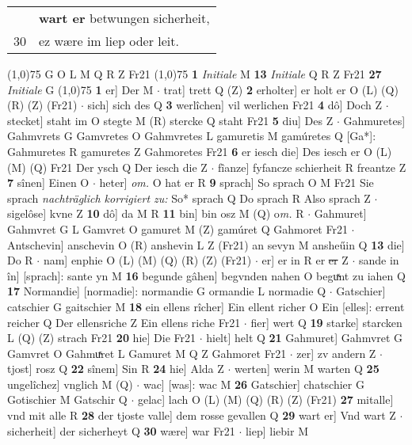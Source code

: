 \documentclass[8pt,a4paper,notitlepage]{article}
\begin{document}
\begin{table}[ht]
\begin{minipage}[t]{0.5\linewidth}
\begin{tabular}{rl}
 & \textbf{wart er} betwungen sicherheit,\\ 
30 & ez wære im liep oder leit.\\ 
\end{tabular}
\scriptsize
\line(1,0){75} \newline
G O L M Q R Z Fr21 \newline
\line(1,0){75} \newline
\textbf{1} \textit{Initiale} M  \textbf{13} \textit{Initiale} Q R Z Fr21  \textbf{27} \textit{Initiale} G  \newline
\line(1,0){75} \newline
\textbf{1} er] Der M  $\cdot$ trat] trett Q (Z) \textbf{2} erholter] er holt er O (L) (Q) (R) (Z) (Fr21)  $\cdot$ sich] sich des Q \textbf{3} werlîchen] vil werlichen Fr21 \textbf{4} dô] Doch Z  $\cdot$ stecket] staht im O stegte M (R) stercke Q staht Fr21 \textbf{5} diu] Des Z  $\cdot$ Gahmuretes] Gahmvrets G Gamvretes O Gahmvretes L gamuretis M gamúretes Q [Ga*]: Gahmuretes R gamuretes Z Gahmoretes Fr21 \textbf{6} er iesch die] Des iesch er O (L) (M) (Q) Fr21 Der ysch Q Der iesch die Z  $\cdot$ fîanze] fyfancze schierheit R freantze Z \textbf{7} sînen] Einen O  $\cdot$ heter] \textit{om.} O hat er R \textbf{9} sprach] So sprach O M Fr21 Sie sprach \textit{nachträglich korrigiert zu:} So* sprach Q Do sprach R Also sprach Z  $\cdot$ sigelôse] kvne Z \textbf{10} dô] da M R \textbf{11} bin] bin osz M (Q) o\textit{m. } R  $\cdot$ Gahmuret] Gahmvret G L Gamvret O gamuret M (Z) gamúret Q Gahmoret Fr21  $\cdot$ Antschevin] anschevin O (R) anshevin L Z (Fr21) an sevyn M ansheűin Q \textbf{13} die] Do R  $\cdot$ nam] enphie O (L) (M) (Q) (R) (Z) (Fr21)  $\cdot$ er] er in R er \sout{er} Z  $\cdot$ sande in în] [sprach]: sante yn M \textbf{16} begunde gâhen] begvnden nahen O beguͯnt zu iahen Q \textbf{17} Normandie] [normadie]: normandie G ormandie L normadie Q  $\cdot$ Gatschier] catschier G gaitschier M \textbf{18} ein ellens rîcher] Ein ellent richer O Ein [elles]: errent reicher Q Der ellensriche Z Ein ellens riche Fr21  $\cdot$ fier] wert Q \textbf{19} starke] starcken L (Q) (Z) strach Fr21 \textbf{20} hie] Die Fr21  $\cdot$ hielt] helt Q \textbf{21} Gahmuret] Gahmvret G Gamvret O Gahmuͯret L Gamuret M Q Z Gahmoret Fr21  $\cdot$ zer] zv andern Z  $\cdot$ tjost] rosz Q \textbf{22} sînem] Sin R \textbf{24} hie] Alda Z  $\cdot$ werten] werin M warten Q \textbf{25} ungelîchez] vnglich M (Q)  $\cdot$ wac] [was]: wac M \textbf{26} Gatschier] chatschier G Gotischier M Gatschir Q  $\cdot$ gelac] lach O (L) (M) (Q) (R) (Z) (Fr21) \textbf{27} mitalle] vnd mit alle R \textbf{28} der tjoste valle] dem rosse gevallen Q \textbf{29} wart er] Vnd wart Z  $\cdot$ sicherheit] der sicherheyt Q \textbf{30} wære] war Fr21  $\cdot$ liep] liebir M \newline

\end{minipage}
\end{table}
\end{document}
